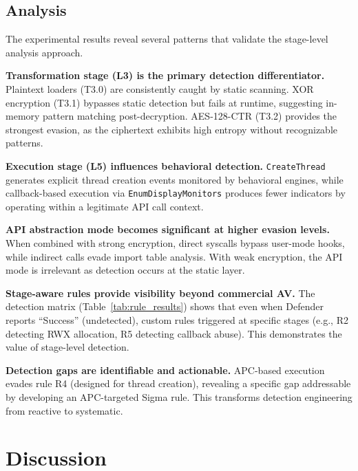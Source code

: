 \documentclass[10pt,a4paper,twocolumn]{article}
\begin{document}

\subsection{Analysis}

The experimental results reveal several patterns that validate the stage-level analysis approach.

\textbf{Transformation stage (L3) is the primary detection differentiator.}
Plaintext loaders (T3.0) are consistently caught by static scanning.
XOR encryption (T3.1) bypasses static detection but fails at runtime, suggesting in-memory pattern matching post-decryption.
AES-128-CTR (T3.2) provides the strongest evasion, as the ciphertext exhibits high entropy without recognizable patterns.

\textbf{Execution stage (L5) influences behavioral detection.}
\texttt{CreateThread} generates explicit thread creation events monitored by behavioral engines, while callback-based execution via \texttt{EnumDisplayMonitors} produces fewer indicators by operating within a legitimate API call context.

\textbf{API abstraction mode becomes significant at higher evasion levels.}
When combined with strong encryption, direct syscalls bypass user-mode hooks, while indirect calls evade import table analysis.
With weak encryption, the API mode is irrelevant as detection occurs at the static layer.

\textbf{Stage-aware rules provide visibility beyond commercial AV.}
The detection matrix (Table~\ref{tab:rule_results}) shows that even when Defender reports ``Success'' (undetected), custom rules triggered at specific stages (e.g., R2 detecting RWX allocation, R5 detecting callback abuse).
This demonstrates the value of stage-level detection.

\textbf{Detection gaps are identifiable and actionable.}
APC-based execution evades rule R4 (designed for thread creation), revealing a specific gap addressable by developing an APC-targeted Sigma rule.
This transforms detection engineering from reactive to systematic.

\section{Discussion}
\end{document}
